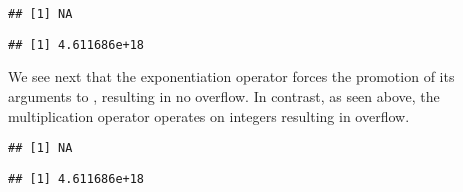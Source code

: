 \documentclass[krantz2]{krantz}\usepackage{knitr}
\begin{document}
\begin{explainbox}
\begin{knitrout}
\begin{kframe}
{\ttfamily\noindent\color{warningcolor}{\#\# Warning in 2147483600L * 2147483600L: NAs produced by integer overflow}}\begin{verbatim}
## [1] NA
\end{verbatim}
\begin{alltt}
 \hlopt{*} 
\end{alltt}
\begin{verbatim}
## [1] 4.611686e+18
\end{verbatim}
\end{kframe}
\end{knitrout}

We see next that the exponentiation operator \Roperator{\^{}} forces the promotion of its arguments to , resulting in no overflow. In contrast, as seen above, the multiplication operator \Roperator{*} operates on integers resulting in overflow.

\begin{knitrout}\footnotesize
{}\color{fgcolor}\begin{kframe}
\begin{alltt}
 \hlopt{*} 
\end{alltt}


{\ttfamily\noindent\color{warningcolor}{\#\# Warning in 2147483600L * 2147483600L: NAs produced by integer overflow}}\begin{verbatim}
## [1] NA
\end{verbatim}
\begin{alltt}
\hlopt{^}
\end{alltt}
\begin{verbatim}
## [1] 4.611686e+18
\end{verbatim}
\end{kframe}
\end{knitrout}

\end{explainbox}
\end{document}
